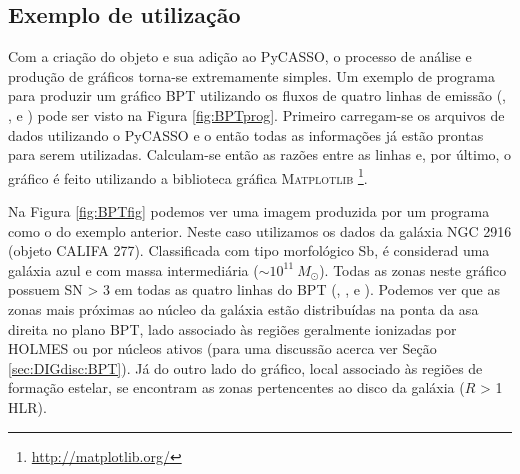 \subsection{Exemplo de utilização}
\label{apendice:EmLinesDataCube:props:example}
Com a criação do objeto \emldc e sua adição ao PyCASSO, o processo de análise e produção de gráficos torna-se extremamente simples. Um exemplo de programa para produzir um gráfico BPT \citep{Baldwin.Phillips.Terlevich.1981a} utilizando os fluxos de quatro linhas de emissão (\Ha, \Hb, \oiii e \nii) pode ser visto na Figura \ref{fig:BPTprog}. Primeiro carregam-se os arquivos de dados utilizando o PyCASSO e o \emldc então todas as informações já estão prontas para serem utilizadas. Calculam-se então as razões entre as linhas e, por último, o gráfico é feito utilizando a biblioteca gráfica M\textsc{atplotlib} \footnote{\href{http://matplotlib.org/}{http://matplotlib.org/}}.

Na Figura \ref{fig:BPTfig} podemos ver uma imagem produzida por um programa como o do exemplo anterior. Neste caso utilizamos os dados da galáxia NGC 2916 (objeto CALIFA 277). Classificada com tipo morfológico Sb, é considerad uma galáxia azul e com massa intermediária ($\sim 10^{11}\ M_\odot$). Todas as zonas neste gráfico possuem SN > 3 em todas as quatro linhas do BPT (\Hb, \oiii, \Ha e \nii). Podemos ver que as zonas mais próximas ao núcleo da galáxia estão distribuídas na ponta da asa direita no plano BPT, lado associado às regiões geralmente ionizadas por HOLMES ou por núcleos ativos (para uma discussão acerca ver Seção \ref{sec:DIGdisc:BPT}). Já do outro lado do gráfico, local associado às regiões de formação estelar, se encontram as zonas pertencentes ao disco da galáxia ($R$ > 1 HLR).

